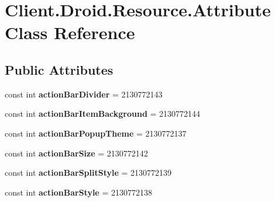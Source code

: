 \hypertarget{classClient_1_1Droid_1_1Resource_1_1Attribute}{}\section{Client.\+Droid.\+Resource.\+Attribute Class Reference}
\label{classClient_1_1Droid_1_1Resource_1_1Attribute}
\subsection*{Public Attributes}
\begin{DoxyCompactItemize}
\item 
\hypertarget{classClient_1_1Droid_1_1Resource_1_1Attribute_a19ce72f78e25ccd3d7a913a2b274a69d}{}const int {\bfseries action\+Bar\+Divider} = 2130772143\label{classClient_1_1Droid_1_1Resource_1_1Attribute_a19ce72f78e25ccd3d7a913a2b274a69d}

\item 
\hypertarget{classClient_1_1Droid_1_1Resource_1_1Attribute_a8d3654407d69378cf3c5ed47e9508e61}{}const int {\bfseries action\+Bar\+Item\+Background} = 2130772144\label{classClient_1_1Droid_1_1Resource_1_1Attribute_a8d3654407d69378cf3c5ed47e9508e61}

\item 
\hypertarget{classClient_1_1Droid_1_1Resource_1_1Attribute_ab302b742baecf13b218c74252572a394}{}const int {\bfseries action\+Bar\+Popup\+Theme} = 2130772137\label{classClient_1_1Droid_1_1Resource_1_1Attribute_ab302b742baecf13b218c74252572a394}

\item 
\hypertarget{classClient_1_1Droid_1_1Resource_1_1Attribute_ae37184d3a328eb327d20d4634e23f54c}{}const int {\bfseries action\+Bar\+Size} = 2130772142\label{classClient_1_1Droid_1_1Resource_1_1Attribute_ae37184d3a328eb327d20d4634e23f54c}

\item 
\hypertarget{classClient_1_1Droid_1_1Resource_1_1Attribute_a4a3e37bbfa2e4f85c1fcfaf7712c0b8b}{}const int {\bfseries action\+Bar\+Split\+Style} = 2130772139\label{classClient_1_1Droid_1_1Resource_1_1Attribute_a4a3e37bbfa2e4f85c1fcfaf7712c0b8b}

\item 
\hypertarget{classClient_1_1Droid_1_1Resource_1_1Attribute_a600def35c8e7cd908fe05007161ae5c9}{}const int {\bfseries action\+Bar\+Style} = 2130772138\label{classClient_1_1Droid_1_1Resource_1_1Attribute_a600def35c8e7cd908fe05007161ae5c9}


\end{DoxyCompactItemize}
